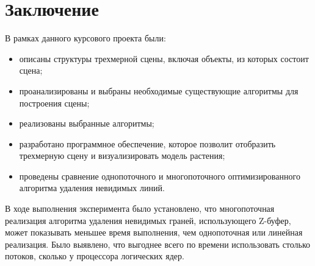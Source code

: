 \chapter*{Заключение}

В рамках данного курсового проекта были:%

\begin{itemize}
	\item описаны структуры трехмерной сцены, включая объекты, из которых состоит сцена;
	\item проанализированы и выбраны необходимые существующие алгоритмы для построения сцены;
	\item реализованы выбранные алгоритмы;
	\item разработано программное обеспечение, которое позволит отобразить трехмерную сцену и визуализировать модель растения;
	\item проведены сравнение однопоточного и многопоточного оптимизированного алгоритма удаления невидимых линий.
\end{itemize}

В ходе выполнения эксперимента было установлено, что многопоточная
реализация алгоритма удаления невидимых граней, использующего Z-буфер,
может показывать меньшее время выполнения, чем однопоточная или
линейная реализация. Было выявлено, что выгоднее всего по
времени использовать столько потоков, сколько у процессора логических
ядер.

